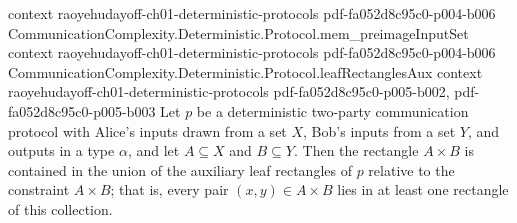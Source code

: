 \begin{lemma}
  {context}
  {raoyehudayoff-ch01-deterministic-protocols}
  {pdf-fa052d8c95c0-p004-b006}
\proofstep
  {CommunicationComplexity.Deterministic.Protocol.mem_preimageInputSet}
  {context}
  {raoyehudayoff-ch01-deterministic-protocols}
  {pdf-fa052d8c95c0-p004-b006}
\proofstep
  {CommunicationComplexity.Deterministic.Protocol.leafRectanglesAux}
  {context}
  {raoyehudayoff-ch01-deterministic-protocols}
  {pdf-fa052d8c95c0-p005-b002,
    pdf-fa052d8c95c0-p005-b003}
Let $p$ be a deterministic two-party communication protocol with Alice's inputs drawn
from a set $X$, Bob's inputs from a set $Y$, and outputs in a type $\alpha$, and let $A
\subseteq X$ and $B \subseteq Y$. Then the rectangle $A \times B$ is contained in the
union of the auxiliary leaf rectangles of $p$ relative to the constraint $A \times B$;
that is, every pair $(x, y) \in A \times B$ lies in at least one rectangle of this
collection.
\end{lemma}

